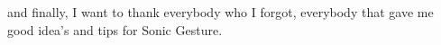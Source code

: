 \documentclass[a4paper, 11pt]{book}
\begin{document}
and finally, I want to thank everybody who I forgot, everybody that gave me good idea's and tips for Sonic Gesture. 


\cleardoublepage
{}
\setcounter{page}{1}















\cleardoublepage
{}
{}





\end{document}

